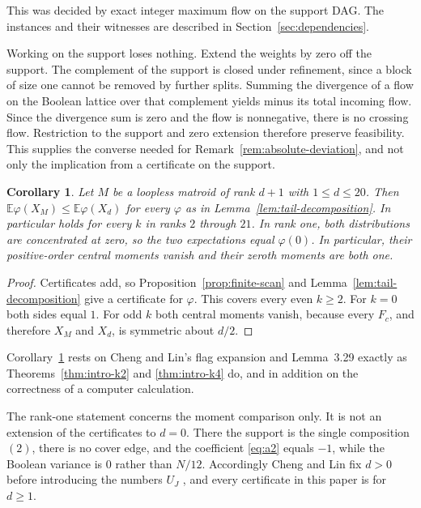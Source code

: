 \documentclass[11pt]{amsart}
\newtheorem{corollary}[theorem]{Corollary}
\theoremstyle{definition}
\theoremstyle{remark}
\newcommand{\E}{\mathbb E}
\begin{document}
This was decided by exact integer maximum flow on the support DAG.  The
instances and their witnesses are described in
Section~\ref{sec:dependencies}.

Working on the support loses nothing.  Extend the weights by zero off the
support.  The complement of the support is closed under refinement, since a
block of size one cannot be removed by further splits.  Summing the
divergence of a flow on the Boolean lattice over that complement yields minus
its total incoming flow.  Since the divergence sum is zero and the flow is
nonnegative, there is no crossing flow.  Restriction to the support and zero
extension therefore preserve feasibility.  This supplies the converse needed
for Remark~\ref{rem:absolute-deviation}, and not only the implication from a
certificate on the support.

\begin{corollary}
\label{cor:finite-all-k}
Let $M$ be a loopless matroid of rank $d+1$ with $1\le d\le20$.  Then
$\E\varphi(X_M)\le\E\varphi(X_d)$ for every $\varphi$ as in
Lemma~\ref{lem:tail-decomposition}.  In particular
\cite[Conjecture~3.14]{ChengLin} holds for every $k$ in ranks $2$ through
$21$.  In rank one, both distributions are concentrated at zero, so the two
expectations equal $\varphi(0)$.  In particular, their positive-order
central moments vanish and their zeroth moments are both one.
\end{corollary}

\begin{proof}
Certificates add, so Proposition~\ref{prop:finite-scan} and
Lemma~\ref{lem:tail-decomposition} give a certificate for $\varphi$.  This
covers every even $k\ge2$.  For $k=0$ both sides equal $1$.  For odd $k$
both central moments vanish, because every $F_c$, and therefore $X_M$ and
$X_d$, is symmetric about $d/2$.
\end{proof}

Corollary~\ref{cor:finite-all-k} rests on Cheng and Lin's flag expansion and
Lemma~3.29 exactly as Theorems~\ref{thm:intro-k2} and \ref{thm:intro-k4} do,
and in addition on the correctness of a computer calculation.

The rank-one statement concerns the moment comparison only.  It is not an
extension of the certificates to $d=0$.  There the support is the single
composition $(2)$, there is no cover edge, and the coefficient \eqref{eq:a2}
equals $-1$, while the Boolean variance is $0$ rather than $N/12$.
Accordingly Cheng and Lin fix $d>0$ before introducing the numbers $U_J$
\cite[\S3.4]{ChengLin}, and every certificate in this paper is for $d\ge1$.
\end{document}
